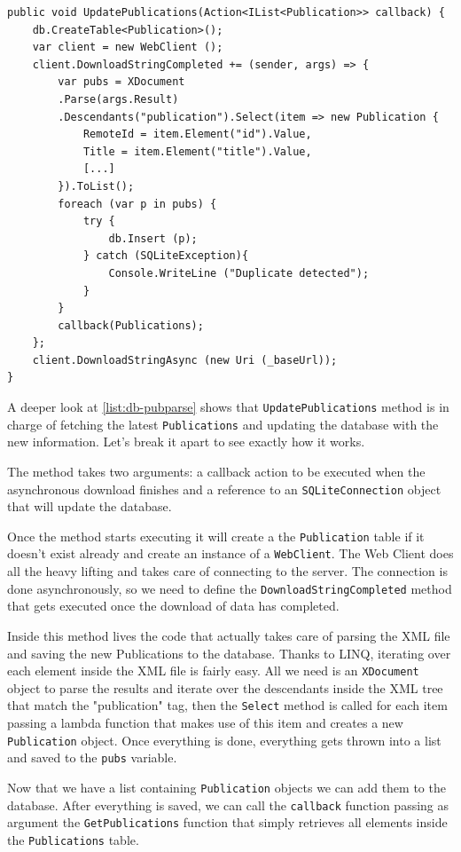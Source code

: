\begin{lstlisting}[frame=lt,caption=PublicationsParser.cs, label={list:db-pubparse}]
public void UpdatePublications(Action<IList<Publication>> callback) {
	db.CreateTable<Publication>();
	var client = new WebClient ();
	client.DownloadStringCompleted += (sender, args) => {
		var pubs = XDocument
		.Parse(args.Result)
		.Descendants("publication").Select(item => new Publication {
			RemoteId = item.Element("id").Value,
			Title = item.Element("title").Value,
			[...]
		}).ToList();
		foreach (var p in pubs) {
			try {
				db.Insert (p);
			} catch (SQLiteException){
				Console.WriteLine ("Duplicate detected");
			}				
		}
		callback(Publications);
	};
	client.DownloadStringAsync (new Uri (_baseUrl));
}
\end{lstlisting}

A deeper look at \autoref{list:db-pubparse} shows that \texttt{UpdatePublications} method is in charge of fetching the latest \texttt{Publications} and updating the database with the new information. Let's break it apart to see exactly how it works.

The method takes two arguments: a callback action to be executed when the asynchronous download finishes and a reference to an \texttt{SQLiteConnection} object that will update the database.

Once the method starts executing it will create a the \texttt{Publication} table if it doesn't exist already and create an instance of a \texttt{WebClient}. The Web Client does all the heavy lifting and takes care of connecting to the server. The connection is done asynchronously, so we need to define the \texttt{DownloadStringCompleted} method that gets executed once the download of data has completed.

Inside this method lives the code that actually takes care of parsing the \ac{XML} file and saving the new Publications to the database. Thanks to \ac{LINQ}, iterating over each element inside the \ac{XML} file is fairly easy. All we need is an \texttt{XDocument} object to parse the results and iterate over the descendants inside the \ac{XML} tree that match the "publication" tag, then the \texttt{Select} method is called for each item passing a lambda function that makes use of this item and creates a new \texttt{Publication} object. Once everything is done, everything gets thrown into a list and saved to the \texttt{pubs} variable. 

Now that we have a list containing \texttt{Publication} objects we can add them to the database. After everything is saved, we can call the \texttt{callback} function passing as argument the \texttt{GetPublications} function that simply retrieves all elements inside the \texttt{Publications} table.

